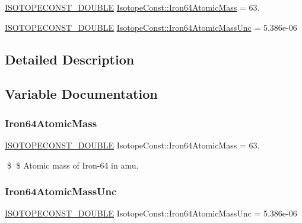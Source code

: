 \begin{DoxyCompactItemize}
\item 
\mbox{\hyperlink{group___isotope_const-_macros_ga8f45a7272ce02c0b4c65c44636ed719a}{I\+S\+O\+T\+O\+P\+E\+C\+O\+N\+S\+T\+\_\+\+D\+O\+U\+B\+LE}} \mbox{\hyperlink{group___isotope_const-_iron-_fe64_gad9158afbb089026843095bb77ea0dfd7}{Isotope\+Const\+::\+Iron64\+Atomic\+Mass}} = 63.
\item 
\mbox{\hyperlink{group___isotope_const-_macros_ga8f45a7272ce02c0b4c65c44636ed719a}{I\+S\+O\+T\+O\+P\+E\+C\+O\+N\+S\+T\+\_\+\+D\+O\+U\+B\+LE}} \mbox{\hyperlink{group___isotope_const-_iron-_fe64_gac04ad0135ee67373b62e79c976a42fa3}{Isotope\+Const\+::\+Iron64\+Atomic\+Mass\+Unc}} = 5.\+386e-\/06
\end{DoxyCompactItemize}


\subsection{Detailed Description}


\subsection{Variable Documentation}
\mbox{\label{group___isotope_const-_iron-_fe64_gad9158afbb089026843095bb77ea0dfd7}} 
\subsubsection{\texorpdfstring{Iron64\+Atomic\+Mass}{Iron64AtomicMass}}
{\footnotesize\ttfamily \mbox{\hyperlink{group___isotope_const-_macros_ga8f45a7272ce02c0b4c65c44636ed719a}{I\+S\+O\+T\+O\+P\+E\+C\+O\+N\+S\+T\+\_\+\+D\+O\+U\+B\+LE}} Isotope\+Const\+::\+Iron64\+Atomic\+Mass = 63.}

\$ \$ Atomic mass of Iron-\/64 in amu. \mbox{\label{group___isotope_const-_iron-_fe64_gac04ad0135ee67373b62e79c976a42fa3}} 
\subsubsection{\texorpdfstring{Iron64\+Atomic\+Mass\+Unc}{Iron64AtomicMassUnc}}
{\footnotesize\ttfamily \mbox{\hyperlink{group___isotope_const-_macros_ga8f45a7272ce02c0b4c65c44636ed719a}{I\+S\+O\+T\+O\+P\+E\+C\+O\+N\+S\+T\+\_\+\+D\+O\+U\+B\+LE}} Isotope\+Const\+::\+Iron64\+Atomic\+Mass\+Unc = 5.\+386e-\/06}

